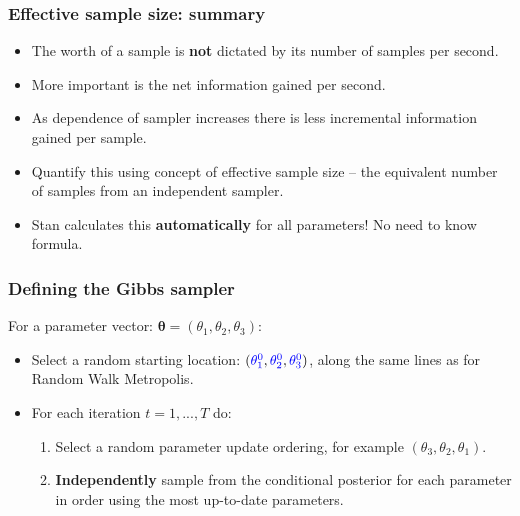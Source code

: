 \documentclass[handout]{beamer}
\begin{document}
\begin{frame}
	\frametitle{Effective sample size: summary}
	\begin{itemize}
		\item<2-> The worth of a sample is \textbf{not} dictated by its number of samples per second.
		\item<3-> More important is the net information gained per second.
		\item<4-> As dependence of sampler increases there is less incremental information gained per sample.
		\item<5-> Quantify this using concept of effective sample size -- the equivalent number of samples from an independent sampler.
		\item<6-> Stan calculates this \textbf{automatically} for all parameters! No need to know formula.
	\end{itemize}
\end{frame}

\begin{frame}
	\frametitle{Defining the Gibbs sampler}
	
	 For a parameter vector: $\boldsymbol{\theta} = (\theta_1,\theta_2,\theta_3)$:
	\begin{itemize}
		\item<3-> Select a random starting location: $(\textcolor{blue}{\theta^0_1},\textcolor{blue}{\theta^0_2},\textcolor{blue}{\theta^0_3})$, along the same lines as for Random Walk Metropolis.
		\item<4-> For each iteration $t = 1,...,T$ do:
		\begin{enumerate}
			\item<5-> Select a random parameter update ordering, for example $(\theta_3,\theta_2,\theta_1)$.
			\item<6-> \textbf{Independently} sample from the conditional posterior for each parameter in order using the most up-to-date parameters.
		\end{enumerate}
	\end{itemize}

\end{frame}
\end{document}
